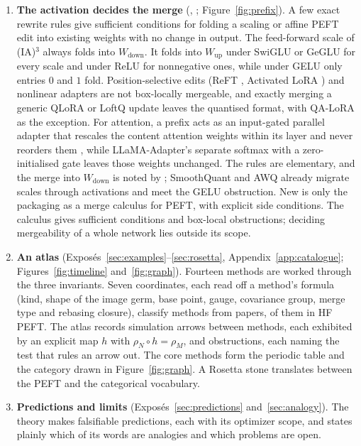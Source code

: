 \begin{enumerate}[label=\textbf{\arabic*.},leftmargin=1.9em]
\item \textbf{The activation decides the merge} (, ; Figure~\ref{fig:prefix}). A few exact rewrite rules give sufficient conditions for folding a scaling or affine PEFT edit into existing weights with no change in output. The feed-forward scale of (IA)$^3$ \citep{liu2022few} always folds into $W_{\mathrm{down}}$. It folds into $W_{\mathrm{up}}$ under SwiGLU or GeGLU for every scale and under ReLU for nonnegative ones, while under GELU only entries $0$ and $1$ fold. Position-selective edits (ReFT \citep{wu2024reft}, Activated LoRA \citep{greenewald2025activated}) and nonlinear adapters are not box-locally mergeable, and exactly merging a generic QLoRA or LoftQ update leaves the quantised format, with QA-LoRA \citep{xu2023qa} as the exception. For attention, a prefix \citep{li2021prefix} acts as an input-gated parallel adapter \citep{he2021unified} that rescales the content attention weights within its layer and never reorders them \citep{petrov2023prompting}, while LLaMA-Adapter's \citep{zhang2023llama} separate softmax with a zero-initialised gate leaves those weights unchanged. The rules are elementary, and the merge into $W_{\mathrm{down}}$ is noted by \citet{liu2022few}; SmoothQuant \citep{xxiao2023smoothquant} and AWQ \citep{xlin2024awq} already migrate scales through activations and meet the GELU obstruction. New is only the packaging as a merge calculus for PEFT, with explicit side conditions. The calculus gives sufficient conditions and box-local obstructions; deciding mergeability of a whole network lies outside its scope.

\item \textbf{An atlas} (Exposés~\ref{sec:examples}--\ref{sec:rosetta}, Appendix~\ref{app:catalogue}; Figures~\ref{fig:timeline} and~\ref{fig:graph}). Fourteen methods are worked through the three invariants. Seven coordinates, each read off a method's formula (kind, shape of the image germ, base point, gauge, covariance group, merge type and rebasing closure), classify \nMethods{} methods from \nPapers{} papers, \nHF{} of them in HF PEFT. The atlas records \nArrows{} simulation arrows between methods, each exhibited by an explicit map $h$ with $\rho_N\circ h=\rho_M$, and \nObstructions{} obstructions, each naming the test that rules an arrow out. The \nCore{} core methods form the periodic table and the category drawn in Figure~\ref{fig:graph}. A Rosetta stone translates between the PEFT and the categorical vocabulary.

\item \textbf{Predictions and limits} (Exposés~\ref{sec:predictions} and~\ref{sec:analogy}). The theory makes falsifiable predictions, each with its optimizer scope, and states plainly which of its words are analogies and which problems are open.
\end{enumerate}

